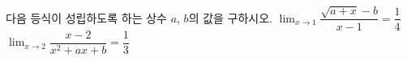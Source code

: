 다음 등식이 성립하도록 하는 상수 $a$, $b$의 값을 구하시오.
 $\displaystyle\lim_{x\to 1}\dfrac{\sqrt{a+x}-b}{x-1}=\dfrac{1}{4}$
 $\displaystyle\lim_{x\to 2}\dfrac{x-2}{x^2+ax+b}=\dfrac{1}{3}$
